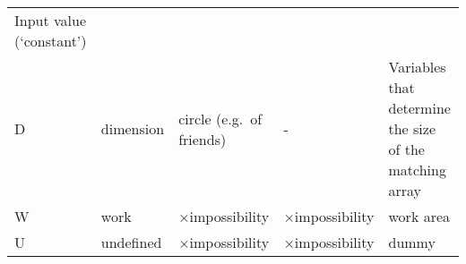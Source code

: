 \begin{longtable}[]{@{}lllll@{}}
\begin{minipage}[t]{0.17\columnwidth}
Input value (`constant')\strut
\end{minipage}\tabularnewline
\begin{minipage}[t]{0.17\columnwidth}\raggedright
D\strut
\end{minipage} & \begin{minipage}[t]{0.17\columnwidth}\raggedright
dimension\strut
\end{minipage} & \begin{minipage}[t]{0.17\columnwidth}\raggedright
circle (e.g.~of friends)\strut
\end{minipage} & \begin{minipage}[t]{0.17\columnwidth}\raggedright
-\strut
\end{minipage} & \begin{minipage}[t]{0.17\columnwidth}\raggedright
Variables that determine the size of the matching array\strut
\end{minipage}\tabularnewline
\begin{minipage}[t]{0.17\columnwidth}\raggedright
W\strut
\end{minipage} & \begin{minipage}[t]{0.17\columnwidth}\raggedright
work\strut
\end{minipage} & \begin{minipage}[t]{0.17\columnwidth}\raggedright
×impossibility\strut
\end{minipage} & \begin{minipage}[t]{0.17\columnwidth}\raggedright
×impossibility\strut
\end{minipage} & \begin{minipage}[t]{0.17\columnwidth}\raggedright
work area\strut
\end{minipage}\tabularnewline
\begin{minipage}[t]{0.17\columnwidth}\raggedright
U\strut
\end{minipage} & \begin{minipage}[t]{0.17\columnwidth}\raggedright
undefined\strut
\end{minipage} & \begin{minipage}[t]{0.17\columnwidth}\raggedright
×impossibility\strut
\end{minipage} & \begin{minipage}[t]{0.17\columnwidth}\raggedright
×impossibility\strut
\end{minipage} & \begin{minipage}[t]{0.17\columnwidth}\raggedright
dummy\strut
\end{minipage}\tabularnewline
\bottomrule
\end{longtable}

